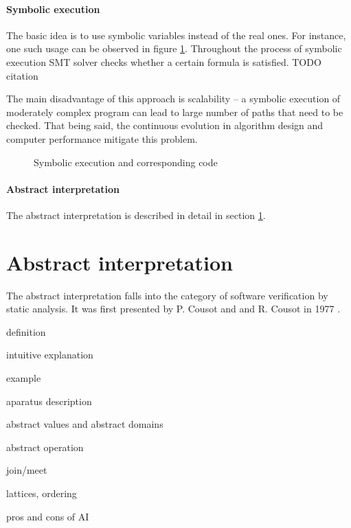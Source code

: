 \documentclass[12pt,final,oneside]{fithesis2}
\begin{document}
\paragraph{Symbolic execution}

The basic idea is to use symbolic variables instead of the real ones.
For instance, one such usage can be observed in figure \ref{fig:se}.
Throughout the process of symbolic execution SMT solver checks whether
a certain formula is satisfied. TODO citation

The main disadvantage of this approach is scalability -- a symbolic
execution of moderately complex program can lead to large number of paths
that need to be checked. That being said, the continuous evolution in
algorithm design and computer performance mitigate this problem.

\begin{figure}

\centering



\caption{Symbolic execution and corresponding code}
\label{fig:se}

\end{figure}

\paragraph{Abstract interpretation}

The abstract interpretation is described in detail in section
\ref{sec:abstractinterpretation}.

\section{Abstract interpretation}
\label{sec:abstractinterpretation}

The abstract interpretation falls into the category of software
verification by static analysis. It was first presented by P. Cousot and
and R. Cousot in 1977 \cite{CousotCousot77-1}.

definition

intuitive explanation

example

aparatus description

abstract values and abstract domains

abstract operation

join/meet

lattices, ordering

pros and cons of AI
\end{document}
